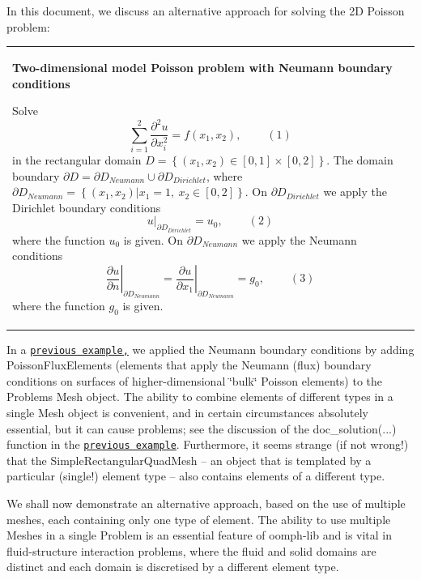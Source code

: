In this document, we discuss an alternative approach for solving the 2D Poisson problem\+: \begin{center} \tabulinesep=1mm
\begin{longtabu} spread 0pt [c]{*{1}{|X[-1]}|}
\hline
\begin{center} {\bfseries Two-\/dimensional model Poisson problem with Neumann boundary conditions} \end{center}  Solve \[ \sum_{i=1}^2 \frac{\partial^2u}{\partial x_i^2} = f(x_1,x_2), \ \ \ \ \ \ \ \ \ \ (1) \] in the rectangular domain $D = \left\{ (x_1,x_2) \in [0,1] \times [0,2]\right\} $. The domain boundary $ \partial D = \partial D_{Neumann} \cup \partial D_{Dirichlet} $, where $ \partial D_{Neumann} = \left\{ (x_1,x_2) | x_1=1, \ x_2\in [0,2] \right\} $. On $ \partial D_{Dirichlet}$ we apply the Dirichlet boundary conditions \[ \left. u\right|_{\partial D_{Dirichlet}}=u_0, \ \ \ \ \ \ \ \ \ \ (2) \] where the function $ u_0 $ is given. On $ \partial D_{Neumann}$ we apply the Neumann conditions \[ \left. \frac{\partial u}{\partial n}\right|_{\partial D_{Neumann}} = \left. \frac{\partial u}{\partial x_1}\right|_{\partial D_{Neumann}} =g_0, \ \ \ \ \ \ \ \ \ \ (3) \] where the function $ g_0 $ is given.   \\
\end{longtabu}
\end{center} 

In a \href{../../two_d_poisson_flux_bc/html/index.html}{\tt previous example,} we applied the Neumann boundary conditions by adding {\ttfamily Poisson\+Flux\+Elements} (elements that apply the Neumann (flux) boundary conditions on surfaces of higher-\/dimensional \char`\"{}bulk\char`\"{} Poisson elements) to the {\ttfamily Problem\textquotesingle{}s} {\ttfamily Mesh} object. The ability to combine elements of different types in a single {\ttfamily Mesh} object is convenient, and in certain circumstances absolutely essential, but it can cause problems; see the discussion of the {\ttfamily doc\+\_\+solution}(...) function in the \href{../../two_d_poisson_flux_bc/html/index.html}{\tt previous example}. Furthermore, it seems strange (if not wrong!) that the {\ttfamily Simple\+Rectangular\+Quad\+Mesh} -- an object that is templated by a particular (single!) element type -- also contains elements of a different type.

We shall now demonstrate an alternative approach, based on the use of multiple meshes, each containing only one type of element. The ability to use multiple {\ttfamily Meshes} in a single {\ttfamily Problem} is an essential feature of {\ttfamily oomph-\/lib} and is vital in fluid-\/structure interaction problems, where the fluid and solid domains are distinct and each domain is discretised by a different element type.


